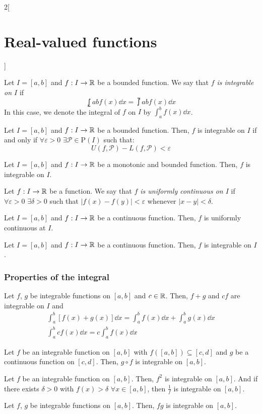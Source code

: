 \documentclass[../../../main.tex]{subfiles}
\begin{document}
\begin{multicols}{2}[\section{Real-valued functions}]
\begin{definition}
  \end{definition}
  \begin{definition}\label{RVF-integrable}
    Let $I=[a,b]$ and $f:I\rightarrow\mathbb{R}$ be a bounded function. We say that \textit{$f$ is integrable on $I$} if $$\lowint{a}{b}f(x)\dd x=\upint{a}{b}f(x)\dd x$$ In this case, we denote the integral of $f$ on $I$ by $\displaystyle\int_a^b f(x)\dd x$.
  \end{definition}
  \begin{lemma}
    Let $I=[a,b]$ and $f:I\rightarrow\mathbb{R}$ be a bounded function. Then, $f$ is integrable on $I$ if and only if $\forall\varepsilon>0$ $\exists\mathcal{P}\in\mathrm{P}(I)$ such that: $$U(f,\mathcal{P})-L(f,\mathcal{P})<\varepsilon$$
  \end{lemma}
  \begin{theorem}
    Let $I=[a,b]$ and $f:I\rightarrow\mathbb{R}$ be a monotonic and bounded function. Then, $f$ is integrable on $I$.
  \end{theorem}
  \begin{definition}
    Let $f:I\rightarrow\mathbb{R}$ be a function. We say that \textit{$f$ is uniformly continuous on $I$} if $\forall\varepsilon>0$ $\exists\delta>0$ such that $|f(x)-f(y)|<\varepsilon$ whenever $|x-y|<\delta$.
  \end{definition}
  \begin{theorem}
    Let $I=[a,b]$ and $f:I\rightarrow\mathbb{R}$ be a continuous function. Then, $f$ is uniformly continuous at $I$.
  \end{theorem}
  \begin{theorem}
    Let $I=[a,b]$ and $f:I\rightarrow\mathbb{R}$ be a continuous function. Then, $f$ is integrable on $I$.
  \end{theorem}
  \subsubsection{Properties of the integral}
  \begin{prop}
    Let $f$, $g$ be integrable functions on $[a,b]$ and $c\in\mathbb{R}$. Then, $f+g$ and $cf$ are integrable on $I$ and
    \begin{gather*}
      \int_a^b[f(x)+g(x)]\dd x=\int_a^bf(x)\dd x+\int_a^bg(x)\dd x\\ \int_a^bcf(x)\dd x=c\int_a^bf(x)\dd x
    \end{gather*}
  \end{prop}
  \begin{theorem}
    Let $f$ be an integrable function on $[a,b]$ with $f([a,b])\subseteq[c,d]$ and $g$ be a continuous function on $[c,d]$. Then, $g\circ f$ is integrable on $[a,b]$.
  \end{theorem}
  \begin{corollary}
    Let $f$ be an integrable function on $[a,b]$. Then, $f^2$ is integrable on $[a,b]$. And if there exists $\delta>0$ with $f(x)>\delta$ $\forall x\in [a,b]$, then $\frac{1}{f}$ is integrable on $[a,b]$.
  \end{corollary}
  \begin{corollary}
    Let $f$, $g$ be integrable functions on $[a,b]$. Then, $fg$ is integrable on $[a,b]$.
  \end{corollary}

\end{multicols}
\end{document}
